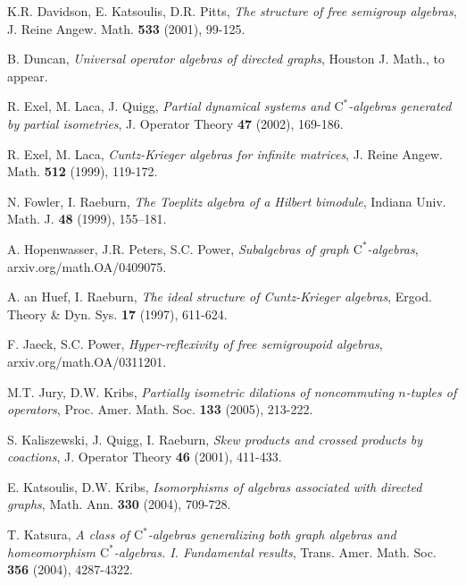 \documentclass[12pt]{amsart}
\theoremstyle{plain}
\theoremstyle{definition}
\newcommand{\ca}{\mathrm{C}^*}
\begin{document}
\begin{thebibliography}{99}
 K.R. Davidson, E. Katsoulis, D.R. Pitts,
\textit{The structure of free semigroup algebras}, J. Reine Angew.
Math. {\bf 533} (2001), 99-125.

 B. Duncan,
\textit{Universal operator algebras of directed graphs}, Houston
J. Math., to appear.

 R. Exel, M. Laca, J. Quigg,
\textit{Partial dynamical systems and $\ca$-algebras generated by
partial isometries}, J. Operator Theory {\bf 47} (2002), 169-186.

 R. Exel, M. Laca,
\textit{Cuntz-Krieger algebras for infinite matrices}, J. Reine
Angew. Math. \textbf{512} (1999), 119-172.

 N. Fowler, I. Raeburn,
\textit{The Toeplitz algebra of a Hilbert bimodule}, Indiana Univ.
Math. J. \textbf{48} (1999), 155--181.


 A. Hopenwasser, J.R. Peters, S.C. Power,
\textit{Subalgebras of graph $\ca$-algebras},
arxiv.org/math.OA/0409075.

 A. an Huef, I. Raeburn,
\textit{The ideal structure of Cuntz-Krieger algebras}, Ergod.
Theory \& Dyn. Sys. {\bf 17} (1997), 611-624.

 F. Jaeck, S.C. Power,
\textit{Hyper-reflexivity of free semigroupoid algebras},
arxiv.org/math.OA/0311201.

 M.T. Jury, D.W. Kribs,
\textit{Partially isometric dilations of noncommuting $n$-tuples
of operators}, Proc. Amer. Math. Soc. {\bf 133} (2005), 213-222.


 S. Kaliszewski, J. Quigg, I. Raeburn,
\textit{Skew products and crossed products by coactions}, J.
Operator Theory \textbf{46} (2001), 411-433.

 E. Katsoulis, D.W. Kribs,
\textit{Isomorphisms of algebras associated with directed graphs},
Math. Ann. {\bf 330} (2004), 709-728.

 T. Katsura,
\textit{A class of $\ca$-algebras generalizing both graph algebras
and homeomorphism $\ca$-algebras. I. Fundamental results}, Trans.
Amer. Math. Soc. {\bf 356} (2004), 4287-4322.


\end{thebibliography}
\end{document}
